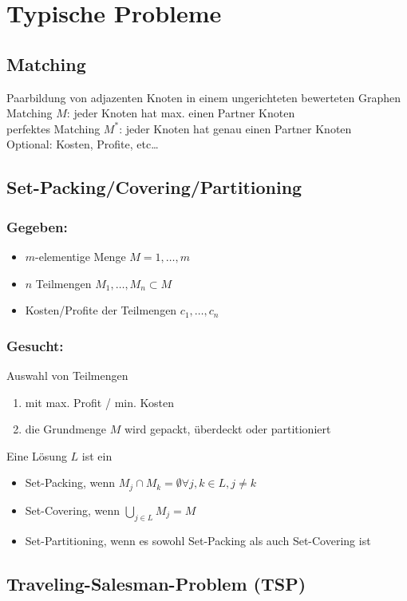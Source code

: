 \documentclass[12pt]{article}
\begin{document}
	\section{Typische Probleme} \label{Standard Probleme}
		\subsection{Matching}
			Paarbildung von adjazenten Knoten in einem ungerichteten bewerteten Graphen\\
			Matching $M$: jeder Knoten hat max. einen Partner Knoten\\
			perfektes Matching $M^*$: jeder Knoten hat genau einen Partner Knoten\\
			Optional: Kosten, Profite, etc\dots
		\subsection{Set-Packing/Covering/Partitioning}
			\subsubsection*{Gegeben: }
			\begin{itemize}
				\item $m$-elementige Menge $M={1, \dots, m}$
				\item $n$ Teilmengen $M_1,\dots,M_n \subset M$
				\item Kosten/Profite der Teilmengen $c_1,\dots,c_n$
			\end{itemize}
			\subsubsection*{Gesucht:} Auswahl von Teilmengen
			\begin{enumerate}
				\item mit max. Profit / min. Kosten
				\item die Grundmenge $M$ wird gepackt, überdeckt oder partitioniert
			\end{enumerate}			
			Eine Lösung $L$ ist ein
			\begin{itemize}
				\item Set-Packing, wenn $M_j \cap M_k = \emptyset \forall j,k \in L, j \neq k$
				\item Set-Covering, wenn $\bigcup_{j\in L} M_j = M$
				\item Set-Partitioning, wenn es sowohl Set-Packing als auch Set-Covering ist
			\end{itemize}
		\subsection{Traveling-Salesman-Problem (TSP)}\label{TSP}
\end{document}
